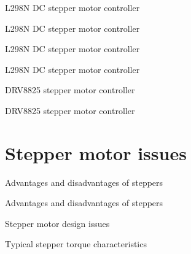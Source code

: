 \documentclass[compress]{beamer}
\begin{document}
{
    \begin{frame}{L298N DC stepper motor controller}
    \end{frame}
}

{
    \begin{frame}{L298N DC stepper motor controller}
    \end{frame}
}

{
    \begin{frame}{L298N DC stepper motor controller}
    \end{frame}
}

{
    \begin{frame}{L298N DC stepper motor controller}
    \end{frame}
}

{
    \begin{frame}{DRV8825 stepper motor controller}
    \end{frame}
}

{
    \begin{frame}{DRV8825 stepper motor controller}
    \end{frame}
}

\section[Limits]{Stepper motor issues}

{
    \begin{frame}{Advantages and disadvantages of steppers}
    \end{frame}
}

{
    \begin{frame}{Advantages and disadvantages of steppers}
    \end{frame}
}
{
    \begin{frame}{Stepper motor design issues}
    \end{frame}
}

{
    \begin{frame}{Typical stepper torque characteristics}
    \end{frame}
}
\end{document}
